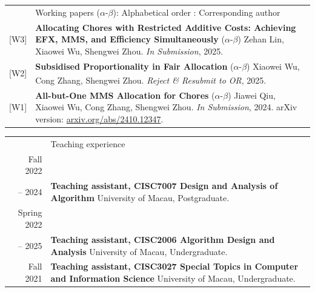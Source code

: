 \documentclass[letterpaper, 11pt]{article}
\newcommand{\headingfont}{\Large\color{OliveGreen}}
\newenvironment{SectionTable}[1]{
	\renewcommand*{\arraystretch}{1.2}
	\setlength{\tabcolsep}{8pt}
	\begin{longtable}{Rp{6.2in}} & #1 \\}
{\end{longtable}\vspace{-.7cm}}
\begin{document}
\begin{SectionTable}{\headingfont Working papers \; \small\color{black}  ($\alpha$-$\beta$): Alphabetical order \quad \Letter: Corresponding author}

[W3] & 
\textbf{Allocating Chores with Restricted Additive Costs: Achieving EFX, MMS, and Efficiency Simultaneously} \newline
($\alpha$-$\beta$) Zehan Lin, Xiaowei Wu, Shengwei Zhou.  \newline
\textit{In Submission}, 2025.\\

[W2] & 
\textbf{Subsidised Proportionality in Fair Allocation} \newline
($\alpha$-$\beta$) Xiaowei Wu, Cong Zhang, Shengwei Zhou\textsuperscript{\Letter}.  \newline
\textit{Reject \& Resubmit to OR}, 2025.\\

[W1] & 
\textbf{All-but-One MMS Allocation for Chores} \newline
($\alpha$-$\beta$) Jiawei Qiu, Xiaowei Wu, Cong Zhang, Shengwei Zhou.  \newline
\textit{In Submission}, 2024. arXiv version: \href{https://arxiv.org/abs/2410.12347}{arxiv.org/abs/2410.12347}.\\

\end{SectionTable}


\begin{SectionTable}{\headingfont Teaching experience}
Fall 2022 \\-- 2024 & 
\textbf{Teaching assistant, CISC7007 Design and Analysis of Algorithm}\newline
University of Macau, Postgraduate. \\

Spring 2022 \\-- 2025 & 
\textbf{Teaching assistant, CISC2006 Algorithm Design and Analysis} \newline
University of Macau, Undergraduate. \\

Fall 2021 & 
\textbf{Teaching assistant, CISC3027 Special Topics in Computer and Information Science}\newline
University of Macau, Undergraduate. \\
\end{SectionTable}
\end{document}
